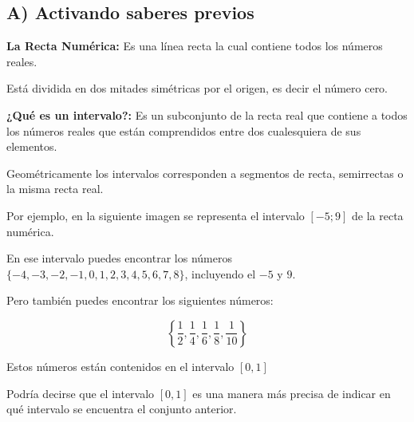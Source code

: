 \documentclass[12pt,a4paper]{article}
\begin{document}
\subsection*{A) Activando saberes previos}

\begin{tcolorbox}[colback=fondoazul,colframe=azuloscuro,title=RECUERDA QUE...,breakable]

\textbf{La Recta Numérica:} Es una línea recta la cual contiene todos los números reales.

Está dividida en dos mitades simétricas por el origen, es decir el número cero.

\textbf{¿Qué es un intervalo?:} Es un subconjunto de la recta real que contiene a todos los números reales que están comprendidos entre dos cualesquiera de sus elementos.

Geométricamente los intervalos corresponden a segmentos de recta, semirrectas o la misma recta real.

Por ejemplo, en la siguiente imagen se representa el intervalo $[-5; 9]$ de la recta numérica.

\begin{center}
\end{center}

En ese intervalo puedes encontrar los números $\{-4, -3, -2, -1, 0, 1, 2, 3, 4, 5, 6, 7, 8\}$, incluyendo el $-5$ y $9$.

Pero también puedes encontrar los siguientes números:

\[ \left\{\frac{1}{2}, \frac{1}{4}, \frac{1}{6}, \frac{1}{8}, \frac{1}{10}\right\} \]

Estos números están contenidos en el intervalo $[0, 1]$

Podría decirse que el intervalo $[0, 1]$ es una manera más precisa de indicar en qué intervalo se encuentra el conjunto anterior.

\end{tcolorbox}
\end{document}
